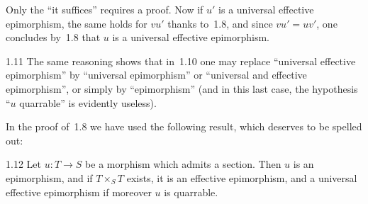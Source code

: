 Only the ``it suffices'' requires a proof. Now if \(u'\) is a universal
effective epimorphism, the same holds for \(vu'\) thanks to~1.8, and since
\(vu'=uv'\), one concludes by~1.8 that \(u\) is a universal effective
epimorphism.

\begin{remark}{1.11}
\label{IV.1.11}
The same reasoning shows that in~1.10 one may replace ``universal effective
epimorphism'' by ``universal epimorphism'' or ``universal and effective
epimorphism'', or simply by ``epimorphism'' (and in this last case, the
hypothesis ``\(u\) quarrable'' is evidently useless).
\end{remark}

In the proof of~1.8 we have used the following result, which deserves to be
spelled out:

\begin{proposition}{1.12}
\label{IV.1.12}
Let \(u\colon T\to S\) be a morphism which admits a section. Then \(u\) is
an epimorphism, and if \(T\times_{S}T\) exists, it is an effective
epimorphism, and a universal effective epimorphism if moreover \(u\) is
quarrable.
\end{proposition}

